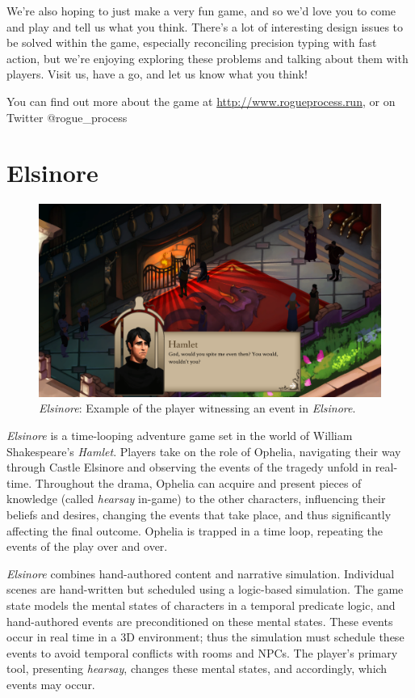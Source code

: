 \documentclass[letterpaper]{article}
\begin{document}
We're also hoping to just make a very fun game, and so we'd love you to come and play and tell us what you think.
There's a lot of interesting design issues to be solved within the game, especially reconciling precision typing with fast action, but we're enjoying exploring these problems and talking about them with players.
Visit us, have a go, and let us know what you think!

You can find out more about the game at \url{http://www.rogueprocess.run}, or on Twitter @rogue\_process


\section{Elsinore}

\begin{figure}[tbh]
  \centering
  \includegraphics[width=\columnwidth]{images/elsinore-screen}
  \caption{\textit{Elsinore}: Example of the player witnessing an event in \textit{Elsinore}.}
  \label{fig:el-setting}
\end{figure}


\textit{Elsinore} is a time-looping adventure game set in the world of William Shakespeare's \textit{Hamlet}.
Players take on the role of Ophelia, navigating their way through Castle Elsinore and observing the events of the tragedy unfold in real-time.
Throughout the drama, Ophelia can acquire and present pieces of knowledge (called \textit{hearsay} in-game) to the other characters, influencing their beliefs and desires, changing the events that take place, and thus significantly affecting the final outcome.
Ophelia is trapped in a time loop, repeating the events of the play over and over.

\textit{Elsinore} combines hand-authored content and narrative simulation.
Individual scenes are hand-written but scheduled using a logic-based simulation.
The game state models the mental states of characters in a temporal predicate logic, and hand-authored events are preconditioned on these mental states.
These events occur in real time in a 3D environment; thus the simulation must schedule these events to avoid temporal conflicts with rooms and NPCs.
The player's primary tool, presenting \textit{hearsay}, changes these mental states, and accordingly, which events may occur.
\end{document}
